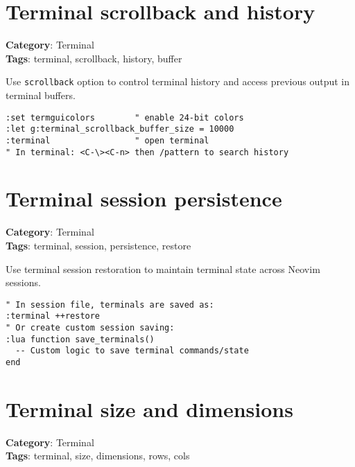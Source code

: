 {{{{{{{{{\section{Terminal scrollback and history}

\textbf{Category}: Terminal\\ \textbf{Tags}: terminal, scrollback, history, buffer
\vspace{0.5cm}

Use {\footnotesize \Verb§scrollback§} option to control terminal history and access previous output in terminal buffers.

\begin{Exa*}{}
\begin{Verbatim}[fontsize=\footnotesize, breaklines, breakanywhere]
:set termguicolors        " enable 24-bit colors
:let g:terminal_scrollback_buffer_size = 10000
:terminal                 " open terminal
" In terminal: <C-\><C-n> then /pattern to search history
\end{Verbatim}
\end{Exa*}

\section{Terminal session persistence}

\textbf{Category}: Terminal\\ \textbf{Tags}: terminal, session, persistence, restore
\vspace{0.5cm}

Use terminal session restoration to maintain terminal state across Neovim sessions.

\begin{Exa*}{}
\begin{Verbatim}[fontsize=\footnotesize, breaklines, breakanywhere]
" In session file, terminals are saved as:
:terminal ++restore
" Or create custom session saving:
:lua function save_terminals()
  -- Custom logic to save terminal commands/state
end
\end{Verbatim}
\end{Exa*}

\section{Terminal size and dimensions}

\textbf{Category}: Terminal\\ \textbf{Tags}: terminal, size, dimensions, rows, cols
\vspace{0.5cm}

}}}}}}}}}
